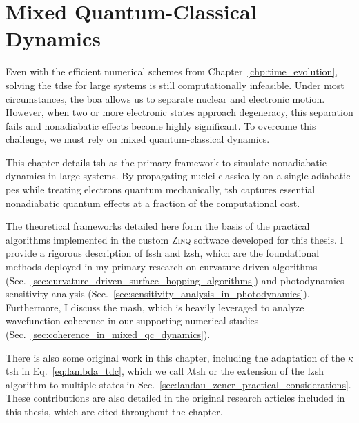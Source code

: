 \chapter{Mixed Quantum-Classical Dynamics}\label{chp:mixed_quantum_classical_dynamics}
Even with the efficient numerical schemes from Chapter~\ref{chp:time_evolution}, solving the \gls{tdse} for large systems is still computationally infeasible. Under most circumstances, the \gls{boa} allows us to separate nuclear and electronic motion. However, when two or more electronic states approach degeneracy, this separation fails and nonadiabatic effects become highly significant. To overcome this challenge, we must rely on mixed quantum-classical dynamics.\supercite{10.1063/1.4757762}

This chapter details \gls{tsh} as the primary framework to simulate nonadiabatic dynamics in large systems. By propagating nuclei classically on a single adiabatic \gls{pes} while treating electrons quantum mechanically, \gls{tsh} captures essential nonadiabatic quantum effects at a fraction of the computational cost.

The theoretical frameworks detailed here form the basis of the practical algorithms implemented in the custom \textsc{Zinq} software developed for this thesis.\supercite{10.5281/zenodo.18386143} I provide a rigorous description of \gls{fssh} and \gls{lzsh}, which are the foundational methods deployed in my primary research on curvature-driven algorithms (Sec.~\ref{sec:curvature_driven_surface_hopping_algorithms}) and photodynamics sensitivity analysis (Sec.~\ref{sec:sensitivity_analysis_in_photodynamics}). Furthermore, I discuss the \gls{mash}, which is heavily leveraged to analyze wavefunction coherence in our supporting numerical studies (Sec.~\ref{sec:coherence_in_mixed_qc_dynamics}).

There is also some original work in this chapter, including the adaptation of the $\kappa$\gls{tsh} in Eq.~\eqref{eq:lambda_tdc}, which we call $\lambda$\gls{tsh} or the extension of the \gls{lzsh} algorithm to multiple states in Sec.~\ref{sec:landau_zener_practical_considerations}. These contributions are also detailed in the original research articles included in this thesis, which are cited throughout the chapter.







